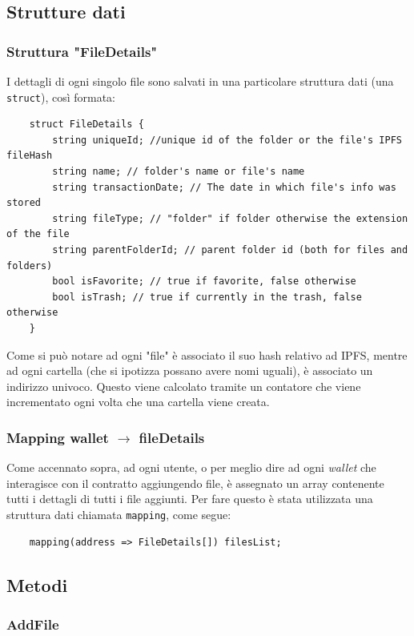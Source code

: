\documentclass{article}
\begin{document}
\subsection{Strutture dati}
\subsubsection{Struttura "FileDetails"}
I dettagli di ogni singolo file sono salvati in una particolare struttura dati (una \texttt{struct}), così formata:

\begin{lstlisting}
    struct FileDetails {
        string uniqueId; //unique id of the folder or the file's IPFS fileHash
        string name; // folder's name or file's name
        string transactionDate; // The date in which file's info was stored
        string fileType; // "folder" if folder otherwise the extension of the file
        string parentFolderId; // parent folder id (both for files and folders)
        bool isFavorite; // true if favorite, false otherwise
        bool isTrash; // true if currently in the trash, false otherwise
    }
\end{lstlisting}

Come si può notare ad ogni "file" è associato il suo hash relativo ad IPFS, mentre ad ogni cartella (che si ipotizza possano avere nomi uguali), è associato un indirizzo univoco. Questo viene calcolato tramite un contatore che viene incrementato ogni volta che una cartella viene creata.

\subsubsection{Mapping wallet $\rightarrow$ fileDetails}
Come accennato sopra, ad ogni utente, o per meglio dire ad ogni \textit{wallet} che interagisce con il contratto aggiungendo file, è assegnato un array contenente tutti i dettagli di tutti i file aggiunti. Per fare questo è stata utilizzata una struttura dati chiamata \texttt{mapping}, come segue:

\begin{lstlisting}
    mapping(address => FileDetails[]) filesList;
\end{lstlisting}

\subsection{Metodi}

\subsubsection{AddFile}
\end{document}
